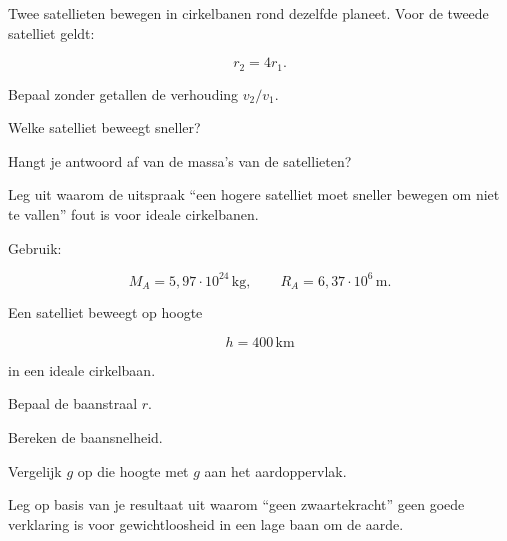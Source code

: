 \documentclass{ximera}
\begin{document}
\begin{oefening}{\oefU\ESS}

Twee satellieten bewegen in cirkelbanen rond dezelfde planeet. Voor de
tweede satelliet geldt:

\[
r_2=4r_1.
\]

\begin{question}
Bepaal zonder getallen de verhouding $v_2/v_1$.
\end{question}

\begin{question}
Welke satelliet beweegt sneller?
\end{question}

\begin{question}
Hangt je antwoord af van de massa's van de satellieten?
\end{question}

\begin{question}
Leg uit waarom de uitspraak ``een hogere satelliet moet sneller bewegen
om niet te vallen'' fout is voor ideale cirkelbanen.
\end{question}

\end{oefening}


\begin{oefening}{\oefB\ESS}

Gebruik:

\[
M_A=5{,}97\cdot10^{24}\,\mathrm{kg},
\qquad
R_A=6{,}37\cdot10^6\,\mathrm m.
\]

Een satelliet beweegt op hoogte

\[
h=400\,\mathrm{km}
\]

in een ideale cirkelbaan.

\begin{question}
Bepaal de baanstraal $r$.
\end{question}

\begin{question}
Bereken de baansnelheid.
\end{question}

\begin{question}
Vergelijk $g$ op die hoogte met $g$ aan het aardoppervlak.
\end{question}

\begin{question}
Leg op basis van je resultaat uit waarom ``geen zwaartekracht'' geen
goede verklaring is voor gewichtloosheid in een lage baan om de aarde.
\end{question}

\end{oefening}
\end{document}
